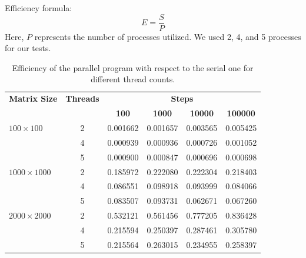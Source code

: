 \documentclass[12pt]{article}
\begin{document}
\newpage
Efficiency formula:
\begin{equation}
	E = \frac{S}{P}
\end{equation}
Here, $P$ represents the number of processes utilized. We used 2, 4, and 5 processes for our tests.

\begin{table}[h!]
	\centering
	\begin{tabular}{lccccc}
		\hline
		\textbf{Matrix Size} & \textbf{Threads} & \multicolumn{4}{c}{\textbf{Steps}}                                                    \\
		\cline{3-6}
		                     &                  & \textbf{100}                       & \textbf{1000} & \textbf{10000} & \textbf{100000} \\
		\hline
		$100\times 100$      & 2                & 0.001662                           & 0.001657      & 0.003565       & 0.005425        \\
		                     & 4                & 0.000939                           & 0.000936      & 0.000726       & 0.001052        \\
		                     & 5                & 0.000900                           & 0.000847      & 0.000696       & 0.000698        \\
		$1000\times 1000$    & 2                & 0.185972                           & 0.222080      & 0.222304       & 0.218403        \\
		                     & 4                & 0.086551                           & 0.098918      & 0.093999       & 0.084066        \\
		                     & 5                & 0.083507                           & 0.093731      & 0.062671       & 0.067260        \\
		$2000\times 2000$    & 2                & 0.532121                           & 0.561456      & 0.777205       & 0.836428        \\
		                     & 4                & 0.215594                           & 0.250397      & 0.287461       & 0.305780        \\
		                     & 5                & 0.215564                           & 0.263015      & 0.234955       & 0.258397        \\
		\hline
	\end{tabular}
	\caption{Efficiency of the parallel program with respect to the serial one for different thread counts.}
	\label{tab:efficiency}
\end{table}
\end{document}
